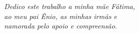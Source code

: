\begin{dedicatoria}
   \vspace*{\fill}
   \centering
   \noindent

   \textit{Dedico este trabalho a minha mãe Fátima,\\
    ao meu pai Ênio, as minhas irmãs e \\
    namorada pelo apoio e compreensão.} \vspace*{\fill}
\end{dedicatoria}
